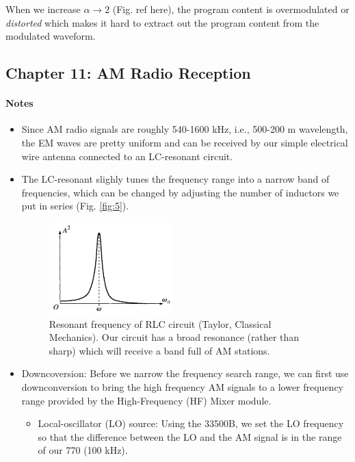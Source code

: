\documentclass[../main.tex]{subfiles}
\begin{document}
When we increase $\alpha \to 2$ (Fig. ref here), the program content is overmodulated or \textit{distorted} which makes it hard to extract
out the program content from the modulated waveform. 


\subsection*{Chapter 11: AM Radio Reception}

\paragraph*{Notes}
\begin{itemize}
    \item Since AM radio signals are roughly 540-1600 kHz, i.e., 500-200 m wavelength, the EM waves are pretty uniform and can be received by our simple electrical wire antenna connected to an LC-resonant circuit. 
    \item The LC-resonant slighly tunes the frequency range into a narrow band of frequencies, which can be changed by adjusting the number of inductors we put in series (Fig. \ref{fig:5}).
    \begin{figure}[ht]
        \centering
        \includegraphics[width=0.45\textwidth]{fig2_11.png}
        \captionsetup{width=0.8\textwidth}
        \caption{Resonant frequency of RLC circuit (Taylor, Classical Mechanics). Our circuit has a broad resonance (rather than sharp) which will receive a band full of AM stations.}
        \label{fig:7}
    \end{figure}
    \item Downcoversion: Before we narrow the frequency search range, we can first use downconversion to bring the high frequency AM signals to a lower frequency range provided by the High-Frequency (HF) Mixer module.
    \begin{itemize}
        \item Local-oscillator (LO) source: Using the 33500B, we set the LO frequency so that the difference between the LO and the AM signal is in the range of our 770 (100 kHz). 

\end{itemize}
\end{itemize}
\end{document}
